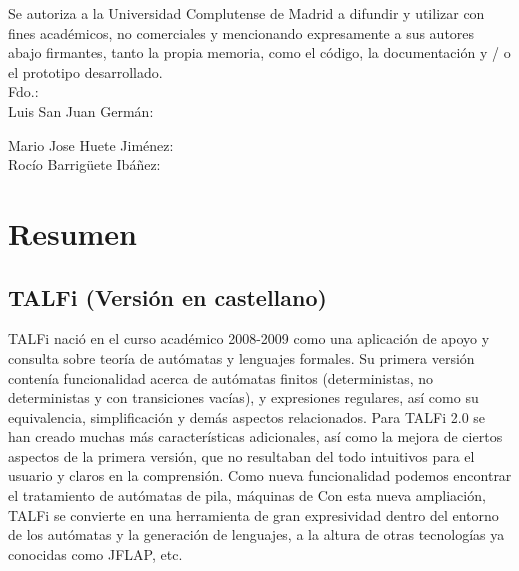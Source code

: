 \documentclass[12pt,a4paper,spanish]{book}
\begin{document}
Se autoriza a la Universidad Complutense de Madrid a difundir y utilizar con fines acad\'emicos, no comerciales y mencionando expresamente a sus autores abajo firmantes, tanto la propia memoria, como el c\'odigo, la documentaci\'on y / o el prototipo desarrollado.\\
\newline
\newline
Fdo.:\\
\newline
Luis San Juan Germ\'an:\\
\newline
\newline
\newline
\newline
\newline
\newline
\newline

\noindent Mario Jose Huete Jim\'enez:\\
\newline
\newline
\newline
\newline
\newline
\newline
\newline
Roc\'io Barrig\"{u}ete Ib\'a\~nez:\\
\tableofcontents


\chapter{Resumen}
\section{TALFi (Versi\'on en castellano)}
TALFi naci\'o en el curso acad\'emico 2008-2009 como una aplicaci\'on de apoyo y consulta sobre teor\'ia de aut\'omatas y lenguajes formales.
Su primera versi\'on conten\'ia funcionalidad acerca de aut\'omatas finitos (deterministas, no deterministas y con transiciones vac\'ias), y expresiones regulares, as\'i como su equivalencia, simplificaci\'on y dem\'as aspectos relacionados.
Para TALFi 2.0 se han creado muchas m\'as caracter\'isticas adicionales, as\'i como la mejora de ciertos aspectos de la primera versi\'on, que no resultaban del todo intuitivos para el usuario y claros en la comprensi\'on.
Como nueva funcionalidad podemos encontrar el tratamiento de aut\'omatas de pila, m\'aquinas de 
Con esta nueva ampliaci\'on, TALFi se convierte en una herramienta de gran expresividad dentro del entorno de los aut\'omatas y la generaci\'on de lenguajes, a la altura de otras tecnolog\'ias ya conocidas como JFLAP, etc. 
\end{document}
